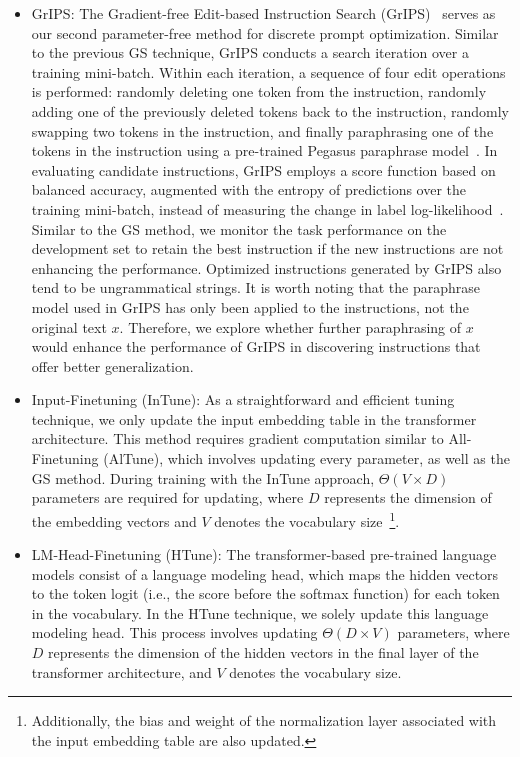 \documentclass[11pt]{article}
\begin{document}
\begin{itemize}
    \item GrIPS: The Gradient-free Edit-based Instruction Search (GrIPS)~\cite{prasad-etal-2023-grips} serves as our second parameter-free method for discrete prompt optimization. Similar to the previous GS technique, GrIPS conducts a search iteration over a training mini-batch. Within each iteration, a sequence of four edit operations is performed: randomly deleting one token from the instruction, randomly adding one of the previously deleted tokens back to the instruction, randomly swapping two tokens in the instruction, and finally paraphrasing one of the tokens in the instruction using a pre-trained Pegasus paraphrase model~\cite{pmlr-v119-zhang20ae}. In evaluating candidate instructions, GrIPS employs a score function based on balanced accuracy, augmented with the entropy of predictions over the training mini-batch, instead of measuring the change in label log-likelihood~\cite{prasad-etal-2023-grips}. Similar to the GS method, we monitor the task performance on the development set to retain the best instruction if the new instructions are not enhancing the performance. Optimized instructions generated by GrIPS also tend to be ungrammatical strings. It is worth noting that the paraphrase model used in GrIPS has only been applied to the instructions, not the original text $x$. Therefore, we explore whether further paraphrasing of $x$ would enhance the performance of GrIPS in discovering instructions that offer better generalization.

    \item Input-Finetuning (InTune): As a straightforward and efficient tuning technique, we only update the input embedding table in the transformer architecture. This method requires gradient computation similar to All-Finetuning (AlTune), which involves updating every parameter, as well as the GS method. During training with the InTune approach, $\Theta(V \times D)$ parameters are required for updating, where $D$ represents the dimension of the embedding vectors and $V$ denotes the vocabulary size~\footnote{Additionally, the bias and weight of the normalization layer associated with the input embedding table are also updated.}.

    \item  LM-Head-Finetuning (HTune): The transformer-based pre-trained language models consist of a language modeling head, which maps the hidden vectors to the token logit (i.e., the score before the softmax function) for each token in the vocabulary. In the HTune technique, we solely update this language modeling head. This process involves updating $\Theta(D \times V)$ parameters, where $D$ represents the dimension of the hidden vectors in the final layer of the transformer architecture, and $V$ denotes the vocabulary size.


\end{itemize}
\end{document}
